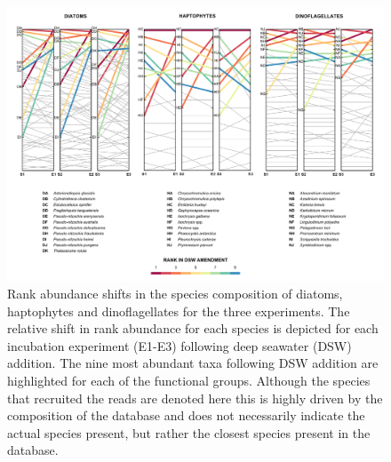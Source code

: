\begin{landscape}
   \vfill        %
\begin{figure}[p!]
  \centering
    \includegraphics[width=1\textwidth]{Images/C4_FigureS2.pdf}
    \caption[Rank abundance shifts in the species composition of diatoms, haptophytes and dinoflagellates]{Rank abundance shifts in the species composition of diatoms, haptophytes and dinoflagellates for the three experiments. The relative shift in rank abundance for each species is depicted for each incubation experiment (E1-E3) following deep seawater (DSW) addition. The nine most abundant taxa following DSW addition are highlighted for each of the functional groups. Although the species that recruited the reads are denoted here this is highly driven by the composition of the database and does not necessarily indicate the actual species present, but rather the closest species present in the database.}
  \label{fig:a4f2}
\end{figure}
    \vfill        %
\end{landscape}




